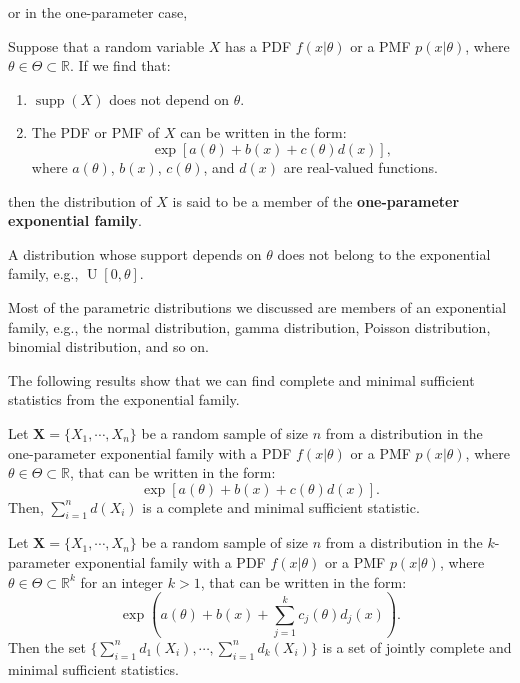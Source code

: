 \documentclass{huhtakm-template-book-v2}
\DeclareMathOperator{\supp}{supp}
\DeclareMathOperator{\U}{U}
\begin{document}
    or in the one-parameter case,
    \begin{defn}
        Suppose that a random variable $X$ has a PDF $f(x|\theta)$ or a PMF $p(x|\theta)$, where $\theta\in\Theta\subset\mathbb{R}$. If we find that:
        \begin{enumerate}
            \item $\supp(X)$ does not depend on $\theta$.
            \item The PDF or PMF of $X$ can be written in the form:
            \begin{equation*}
                \exp[a(\theta)+b(x)+c(\theta)d(x)],
            \end{equation*}
            where $a(\theta)$, $b(x)$, $c(\theta)$, and $d(x)$ are real-valued functions.
        \end{enumerate}
        then the distribution of $X$ is said to be a member of the \textbf{one-parameter exponential family}.
    \end{defn}
    \begin{rem}
        A distribution whose support depends on $\theta$ does not belong to the exponential family, e.g., $\U[0,\theta]$.
    \end{rem}
    \begin{rem}
        Most of the parametric distributions we discussed are members of an exponential family, e.g., the normal distribution, gamma distribution, Poisson distribution, binomial distribution, and so on.
    \end{rem}
    The following results show that we can find complete and minimal sufficient statistics from the exponential family.
    \begin{thm}
        \label{Chapter 3 (Theorem) Exponential family to complete and minimal sufficient statistic}
        Let $\mathbf{X}=\{X_{1},\cdots,X_{n}\}$ be a random sample of size $n$ from a distribution in the one-parameter exponential family with a PDF $f(x|\theta)$ or a PMF $p(x|\theta)$, where $\theta\in\Theta\subset\mathbb{R}$, that can be written in the form:
        \begin{equation*}
            \exp[a(\theta)+b(x)+c(\theta)d(x)].
        \end{equation*}
        Then, $\sum_{i=1}^{n}d(X_{i})$ is a complete and minimal sufficient statistic.
    \end{thm}
    \begin{thm}
        \label{Chapter 3 (Theorem) Exponential family to jointly complete and minimal sufficient statistics}
        Let $\mathbf{X}=\{X_{1},\cdots,X_{n}\}$ be a random sample of size $n$ from a distribution in the $k$-parameter exponential family with a PDF $f(x|\theta)$ or a PMF $p(x|\theta)$, where $\theta\in\Theta\subset\mathbb{R}^{k}$ for an integer $k>1$, that can be written in the form:
        \begin{equation*}
            \exp\left(a(\theta)+b(x)+\sum_{j=1}^{k}c_{j}(\theta)d_{j}(x)\right).
        \end{equation*}
        Then the set $\{\sum_{i=1}^{n}d_{1}(X_{i}),\cdots,\sum_{i=1}^{n}d_{k}(X_{i})\}$ is a set of jointly complete and minimal sufficient statistics.
    \end{thm}
\end{document}
